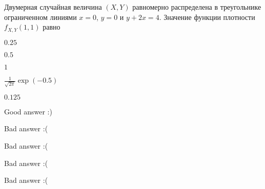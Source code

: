 
\begin{question}
Двумерная случайная величина \((X, Y)\) равномерно распределена в
треугольнике ограниченном линиями \(x=0\), \(y=0\) и \(y+2x=4\).
Значение функции плотности \(f_{X,Y}(1,1)\) равно
\begin{answerlist}
  \item \(0.25\)
  \item \(0.5\)
  \item \(1\)
  \item \(\frac{1}{\sqrt{2\pi}}\exp(-0.5)\)
  \item \(0.125\)
\end{answerlist}
\end{question}

\begin{solution}
\begin{answerlist}
  \item Good answer :)
  \item Bad answer :(
  \item Bad answer :(
  \item Bad answer :(
  \item Bad answer :(
\end{answerlist}
\end{solution}

